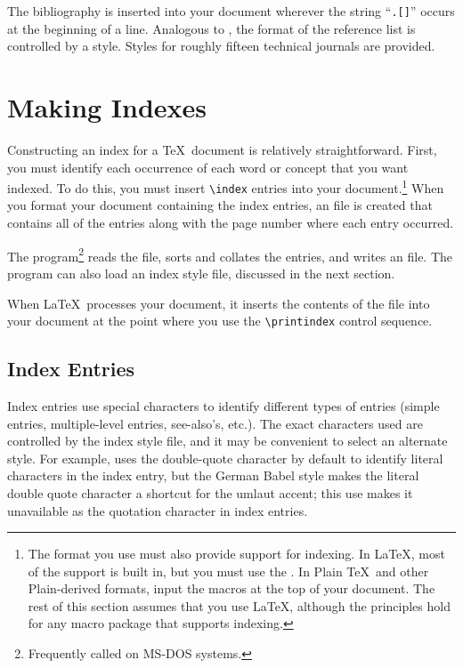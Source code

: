 The bibliography is inserted into your document wherever the string
``\verb|.[]|'' occurs at the beginning of a line.  Analogous to \BibTeX,
the format of the reference list is controlled by a  style.
Styles for roughly fifteen technical journals are provided.

\section{Making Indexes}

Constructing an index for 
a \TeX\ document is relatively straightforward.
First, you must identify each occurrence of each word or concept that you want
indexed.  To do this, you must insert \verb|\index| entries into your
document.\footnote{The format you use must also provide support for
indexing.  In \LaTeX{}, most of the 
support is built in, but you must use the
.  In Plain \TeX\ and other Plain-derived
formats, input the  macros at the top of your document.
The rest of this section assumes that you use \LaTeX, although the
principles hold for any macro package that supports indexing.}  When you
format your document containing the 
index entries, an  file is
created that contains all of the entries along with the page number where each
entry occurred.

The  
program\footnote{Frequently called  
on MS-DOS systems.} reads the  file, sorts and collates the entries,
and writes an  file.  The  
program can also 
load an index style file, discussed in the next section.

When \LaTeX\ processes your document, it inserts
the contents of the  file into your document at the point where you
use the \verb|\printindex| control sequence.

\subsection{Index Entries}

Index entries use special 
characters to identify different types of entries
(simple entries, multiple-level entries, see-also's, etc.).  The exact
characters used are controlled by the index style file, and it may be
convenient to select an alternate style.  For example,
 uses the double-quote character by default to identify literal
characters in the index entry, but the German Babel style makes the literal
double quote character a shortcut for the umlaut accent; this use makes it
unavailable as the quotation character in index entries.

